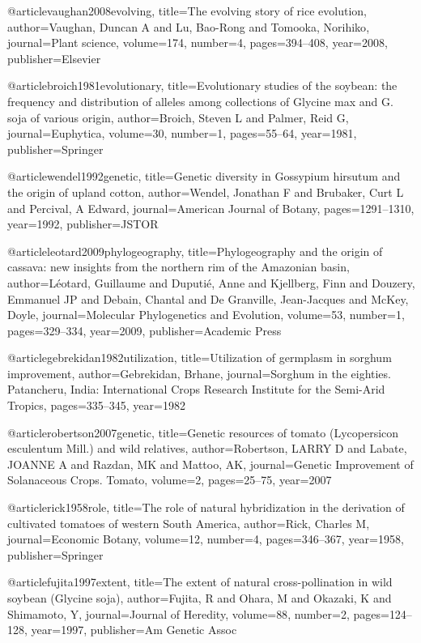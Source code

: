 @article{vaughan2008evolving,
  title={The evolving story of rice evolution},
  author={Vaughan, Duncan A and Lu, Bao-Rong and Tomooka, Norihiko},
  journal={Plant science},
  volume={174},
  number={4},
  pages={394--408},
  year={2008},
  publisher={Elsevier}
}

@article{broich1981evolutionary,
  title={Evolutionary studies of the soybean: the frequency and distribution of alleles among collections of Glycine max and G. soja of various origin},
  author={Broich, Steven L and Palmer, Reid G},
  journal={Euphytica},
  volume={30},
  number={1},
  pages={55--64},
  year={1981},
  publisher={Springer}
}

@article{wendel1992genetic,
  title={Genetic diversity in Gossypium hirsutum and the origin of upland cotton},
  author={Wendel, Jonathan F and Brubaker, Curt L and Percival, A Edward},
  journal={American Journal of Botany},
  pages={1291--1310},
  year={1992},
  publisher={JSTOR}
}

@article{leotard2009phylogeography,
  title={Phylogeography and the origin of cassava: new insights from the northern rim of the Amazonian basin},
  author={L{\'e}otard, Guillaume and Duputi{\'e}, Anne and Kjellberg, Finn and Douzery, Emmanuel JP and Debain, Chantal and De Granville, Jean-Jacques and McKey, Doyle},
  journal={Molecular Phylogenetics and Evolution},
  volume={53},
  number={1},
  pages={329--334},
  year={2009},
  publisher={Academic Press}
}

@article{gebrekidan1982utilization,
  title={Utilization of germplasm in sorghum improvement},
  author={Gebrekidan, Brhane},
  journal={Sorghum in the eighties. Patancheru, India: International Crops Research Institute for the Semi-Arid Tropics},
  pages={335--345},
  year={1982}
}

@article{robertson2007genetic,
  title={Genetic resources of tomato (Lycopersicon esculentum Mill.) and wild relatives},
  author={Robertson, LARRY D and Labate, JOANNE A and Razdan, MK and Mattoo, AK},
  journal={Genetic Improvement of Solanaceous Crops. Tomato},
  volume={2},
  pages={25--75},
  year={2007}
}

@article{rick1958role,
  title={The role of natural hybridization in the derivation of cultivated tomatoes of western South America},
  author={Rick, Charles M},
  journal={Economic Botany},
  volume={12},
  number={4},
  pages={346--367},
  year={1958},
  publisher={Springer}
}

@article{fujita1997extent,
  title={The extent of natural cross-pollination in wild soybean (Glycine soja)},
  author={Fujita, R and Ohara, M and Okazaki, K and Shimamoto, Y},
  journal={Journal of Heredity},
  volume={88},
  number={2},
  pages={124--128},
  year={1997},
  publisher={Am Genetic Assoc}
}

